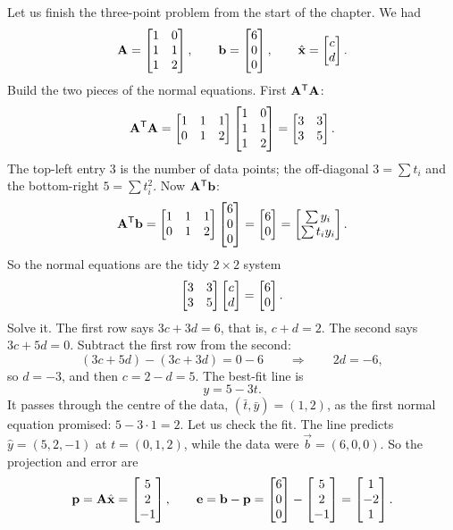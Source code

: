 Let us finish the three-point problem from the start of the chapter. We had
\[
  \mathbf{A}=\begin{bmatrix} 1 & 0\\ 1 & 1\\ 1 & 2\end{bmatrix},
  \qquad
  \mathbf{b}=\begin{bmatrix}6\\0\\0\end{bmatrix},
  \qquad
  \hat{\mathbf{x}}=\begin{bmatrix}c\\d\end{bmatrix}.
\]
Build the two pieces of the normal equations. First $\mathbf{A}^{\mathsf{T}}\mathbf{A}$:
\[
  \mathbf{A}^{\mathsf{T}}\mathbf{A}
  = \begin{bmatrix} 1&1&1\\ 0&1&2\end{bmatrix}
    \begin{bmatrix} 1&0\\ 1&1\\ 1&2\end{bmatrix}
  = \begin{bmatrix} 3 & 3\\ 3 & 5\end{bmatrix}.
\]
The top-left entry $3$ is the number of data points; the off-diagonal $3=\sum t_i$ and the
bottom-right $5=\sum t_i^2$. Now $\mathbf{A}^{\mathsf{T}}\mathbf{b}$:
\[
  \mathbf{A}^{\mathsf{T}}\mathbf{b}
  = \begin{bmatrix} 1&1&1\\ 0&1&2\end{bmatrix}\begin{bmatrix}6\\0\\0\end{bmatrix}
  = \begin{bmatrix}6\\0\end{bmatrix}
  = \begin{bmatrix}\sum y_i \\ \sum t_i y_i\end{bmatrix}.
\]
So the normal equations are the tidy $2\times 2$ system
\[
  \begin{bmatrix} 3 & 3\\ 3 & 5\end{bmatrix}\begin{bmatrix}c\\d\end{bmatrix} = \begin{bmatrix}6\\0\end{bmatrix}.
\]
Solve it. The first row says $3c+3d=6$, that is, $c+d=2$. The second says $3c+5d=0$. Subtract the
first row from the second:
\[
  (3c+5d)-(3c+3d) = 0-6
  \qquad\Longrightarrow\qquad
  2d=-6,
\]
so $d=-3$, and then $c=2-d=5$. The best-fit line is
\[
  \boxed{\,y = 5 - 3t.\,}
\]
It passes through the centre of the data, $(\bar{t},\bar{y})=(1,2)$, as the first normal equation
promised: $5-3\cdot1=2$.
Let us check the fit. The line predicts $\hat{y}=(5,2,-1)$ at $t=(0,1,2)$, while the data were
$\vec{b}=(6,0,0)$. So the projection and error are
\[
  \mathbf{p}=\mathbf{A}\hat{\mathbf{x}}=\begin{bmatrix}5\\2\\-1\end{bmatrix},
  \qquad
  \mathbf{e}=\mathbf{b}-\mathbf{p}=\begin{bmatrix}6\\0\\0\end{bmatrix}-\begin{bmatrix}5\\2\\-1\end{bmatrix}=\begin{bmatrix}1\\-2\\1\end{bmatrix}.
\]
